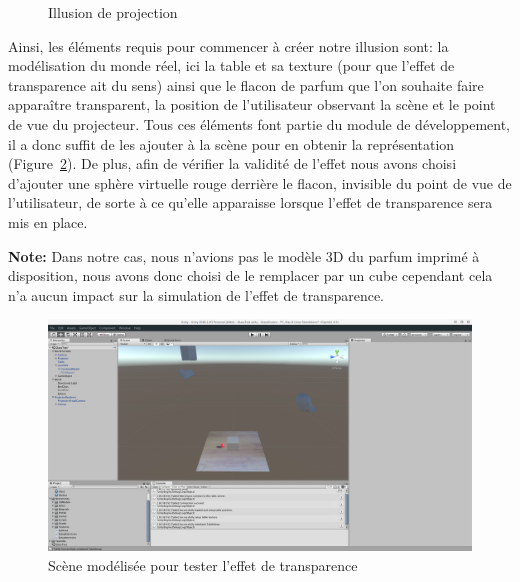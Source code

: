 \begin{figure}[H]
\centering
\caption{Illusion de projection}
\label{fig:projpov}
\end{figure}

Ainsi, les éléments requis pour commencer à créer notre illusion sont: la modélisation du monde réel, ici la table et sa texture (pour que l'effet de transparence ait du sens) ainsi que le flacon de parfum que l'on souhaite faire apparaître transparent, la position de l'utilisateur observant la scène et le point de vue du projecteur. Tous ces éléments font partie du module de développement, il a donc suffit de les ajouter à la scène pour en obtenir la représentation (Figure~\ref{fig:unity:projscene}).
De plus, afin de vérifier la validité de l'effet nous avons choisi d'ajouter une sphère virtuelle rouge derrière le flacon, invisible du point de vue de l'utilisateur, de sorte à ce qu'elle apparaisse lorsque l'effet de transparence sera mis en place.

\textbf{Note:} Dans notre cas, nous n'avions pas le modèle 3D du parfum imprimé à disposition, nous avons donc choisi de le remplacer par un cube cependant cela n'a aucun impact sur la simulation de l'effet de transparence.

\begin{figure}[H]
\centering
\includegraphics[width=0.75\linewidth, trim = 12cm 12cm 20cm 4.5cm, clip]{images/Unity-Projection-RealScene}
\caption{Scène modélisée pour tester l'effet de transparence}
\label{fig:unity:projscene}
\end{figure}

